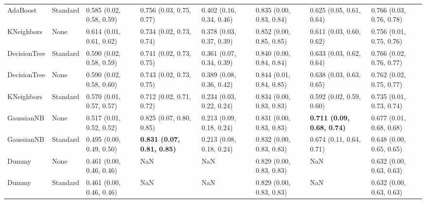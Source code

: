 \begin{tabular}{llllllll}
AdaBoost & Standard & 0.585 (0.02, 0.58, 0.59) & 0.756 (0.03, 0.75, 0.77) & 0.402 (0.16, 0.34, 0.46) & 0.835 (0.00, 0.83, 0.84) & 0.625 (0.05, 0.61, 0.64) & 0.766 (0.03, 0.76, 0.78) \\
KNeighbors & None & 0.614 (0.01, 0.61, 0.62) & 0.734 (0.02, 0.73, 0.74) & 0.378 (0.03, 0.37, 0.39) & 0.852 (0.00, 0.85, 0.85) & 0.611 (0.03, 0.60, 0.62) & 0.756 (0.01, 0.75, 0.76) \\
DecisionTree & Standard & 0.590 (0.02, 0.58, 0.59) & 0.741 (0.02, 0.73, 0.75) & 0.361 (0.07, 0.34, 0.39) & 0.840 (0.00, 0.84, 0.84) & 0.633 (0.03, 0.62, 0.64) & 0.766 (0.02, 0.76, 0.77) \\
DecisionTree & None & 0.590 (0.02, 0.58, 0.60) & 0.743 (0.02, 0.73, 0.75) & 0.389 (0.08, 0.36, 0.42) & 0.844 (0.01, 0.84, 0.85) & 0.638 (0.03, 0.63, 0.65) & 0.762 (0.02, 0.75, 0.77) \\
KNeighbors & Standard & 0.570 (0.01, 0.57, 0.57) & 0.712 (0.02, 0.71, 0.72) & 0.234 (0.03, 0.22, 0.24) & 0.834 (0.00, 0.83, 0.83) & 0.592 (0.02, 0.59, 0.60) & 0.735 (0.01, 0.73, 0.74) \\
GaussianNB & None & 0.517 (0.01, 0.52, 0.52) & 0.825 (0.07, 0.80, 0.85) & 0.213 (0.09, 0.18, 0.24) & 0.831 (0.00, 0.83, 0.83) & \textbf{0.711 (0.09, 0.68, 0.74)} & 0.677 (0.01, 0.68, 0.68) \\
GaussianNB & Standard & 0.495 (0.00, 0.49, 0.50) & \textbf{0.831 (0.07, 0.81, 0.85)} & 0.213 (0.08, 0.18, 0.24) & 0.832 (0.00, 0.83, 0.83) & 0.674 (0.11, 0.64, 0.71) & 0.648 (0.00, 0.65, 0.65) \\
Dummy & None & 0.461 (0.00, 0.46, 0.46) & NaN & NaN & 0.829 (0.00, 0.83, 0.83) & NaN & 0.632 (0.00, 0.63, 0.63) \\
Dummy & Standard & 0.461 (0.00, 0.46, 0.46) & NaN & NaN & 0.829 (0.00, 0.83, 0.83) & NaN & 0.632 (0.00, 0.63, 0.63) \\
\bottomrule
\end{tabular}
